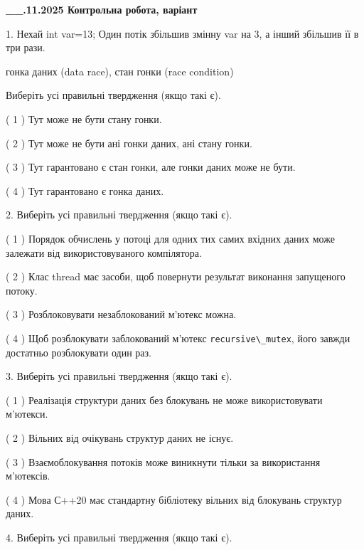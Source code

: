 \documentclass[12pt, ukrainian]{article}
\def\code#1{\Verb!#1!}
\begin{document}
\newpage
\begin {large}

\textbf{\_\_.11.2025 Контрольна робота, варіант  }\par


{
1. Нехай int var=13; Один потік збільшив змінну var на 3, а інший збільшив її в три рази.

гонка даних (data race), стан гонки (race condition)

Виберіть усі правильні твердження (якщо такі є).\par
\vspace{2mm}
( 1 ) Тут може не бути стану гонки.%

( 2 ) Тут може не бути ані гонки даних, ані стану гонки.%

( 3 ) Тут гарантовано є стан гонки, але гонки даних може не бути.%

( 4 ) Тут гарантовано є гонка даних.%


2. Виберіть усі правильні твердження (якщо такі є).\par
\vspace{2mm}

( 1 ) Порядок обчислень у потоці для одних тих самих вхідних даних може залежати від використовуваного компілятора.%

( 2 ) Клас thread має засоби, щоб повернути результат виконання запущеного потоку.%

( 3 ) Розблоковувати незаблокований м’ютекс можна.%

( 4 ) Щоб розблокувати заблокований м’ютекс \code{recursive\_mutex}, його завжди достатньо розблокувати один раз.%


3. Виберіть усі правильні твердження (якщо такі є).\par
\vspace{2mm}

( 1 ) Реалізація структури даних без блокувань не може використовувати м’ютекси.%

( 2 ) Вільних від очікувань структур даних не існує.%

( 3 ) Взаємоблокування потоків може виникнути тільки за використання м’ютексів.%

( 4 ) Мова С++20 має стандартну бібліотеку вільних від блокувань структур даних.%


4. Виберіть усі правильні твердження (якщо такі є).\par
\vspace{2mm}

}
\end{large}
\end{document}
